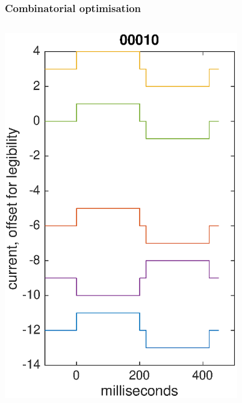 \documentclass{beamer}
\begin{document}
\begin{frame}
  \frametitle{Combinatorial optimisation}
  \begin{columns}
    \column{5 cm}
    \begin{center}
      \includegraphics[width=0.8\textwidth]{pulsedemo1}
    \end{center}
    \column{5 cm}
    \begin{center}

\end{center}
\end{columns}
\end{frame}
\end{document}
